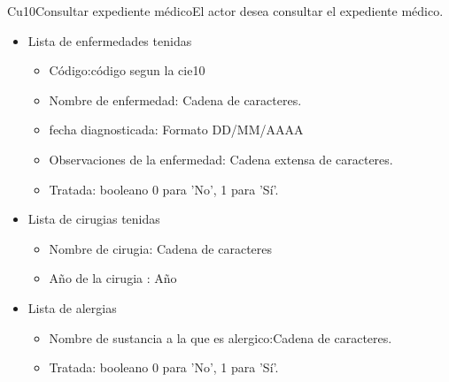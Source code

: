 \begin{UseCase}{Cu10}{Consultar expediente médico}{El actor desea consultar el expediente médico.}
{\begin{itemize}
\begin{itemize}
\begin{itemize}
                \item Calle: Cádena de caracteres.
                \item Número: Cádena de caracteres.
                \item Colonia: Cádena de caracteres.
                \item Estado: Cádena de caracteres.
                \item País : Cádena de caracteres.
                \item Teléfono particular: Cádena de 8 a 10 caracteres.
                \item Teléfono de emergencia: Cádena de 8 a 10 caracteres.
            \end{itemize}    
        
        \end{itemize}
        
       \item Lista de enfermedades tenidas
        \begin{itemize}
            \item Código:código segun la cie10
            \item Nombre de enfermedad: Cadena de caracteres. 
            \item fecha diagnosticada: Formato DD/MM/AAAA
            \item Observaciones de la enfermedad: Cadena extensa de caracteres.
            \item Tratada: booleano 0 para 'No', 1 para 'Sí'.

        \end{itemize}
        
        \item Lista de cirugias tenidas
        \begin{itemize}
            \item Nombre de cirugia: Cadena de caracteres
            \item Año de la cirugia : Año 
        \end{itemize}
        
        \item Lista de alergias
        \begin{itemize}
            \item Nombre de sustancia a la que es alergico:Cadena de caracteres.
            \item Tratada: booleano 0 para 'No', 1 para 'Sí'.
        \end{itemize}
        

\end{itemize}}
\end{UseCase}
